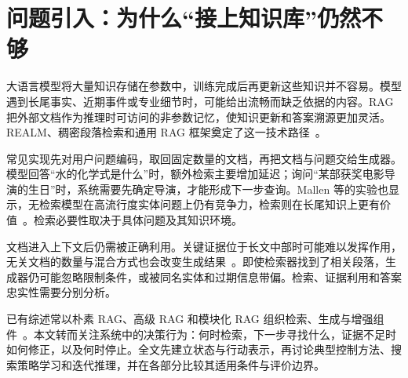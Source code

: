 \section{问题引入：为什么“接上知识库”仍然不够}
\label{sec:intro}

大语言模型将大量知识存储在参数中，训练完成后再更新这些知识并不容易。模型遇到长尾事实、近期事件或专业细节时，可能给出流畅而缺乏依据的内容。RAG 把外部文档作为推理时可访问的非参数记忆，使知识更新和答案溯源更加灵活。REALM、稠密段落检索和通用 RAG 框架奠定了这一技术路径~\citep{guu2020realm,karpukhin2020dense,lewis2020rag}。

常见实现先对用户问题编码，取回固定数量的文档，再把文档与问题交给生成器。模型回答“水的化学式是什么”时，额外检索主要增加延迟；询问“某部获奖电影导演的生日”时，系统需要先确定导演，才能形成下一步查询。Mallen 等的实验也显示，无检索模型在高流行度实体问题上仍有竞争力，检索则在长尾知识上更有价值~\citep{mallen2023trust}。检索必要性取决于具体问题及其知识环境。

文档进入上下文后仍需被正确利用。关键证据位于长文中部时可能难以发挥作用，无关文档的数量与混合方式也会改变生成结果~\citep{liu2024lost,cuconasu2024noise}。即使检索器找到了相关段落，生成器仍可能忽略限制条件，或被同名实体和过期信息带偏。检索、证据利用和答案忠实性需要分别分析。

已有综述常以朴素 RAG、高级 RAG 和模块化 RAG 组织检索、生成与增强组件~\citep{gao2024survey}。本文转而关注系统中的决策行为：何时检索，下一步寻找什么，证据不足时如何修正，以及何时停止。全文先建立状态与行动表示，再讨论典型控制方法、搜索策略学习和迭代推理，并在各部分比较其适用条件与评价边界。
